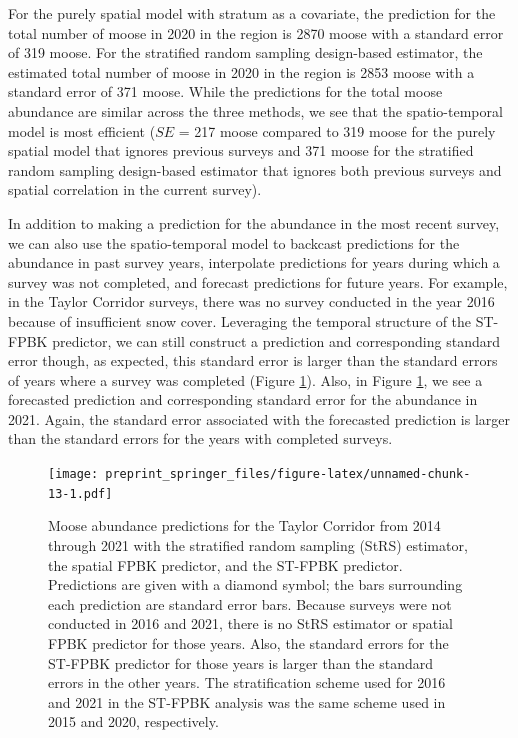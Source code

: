 \documentclass[smallextended]{svjour3}       %
\begin{document}
For the purely spatial model with stratum as a covariate, the prediction
for the total number of moose in 2020 in the region is 2870 moose with a
standard error of 319 moose. For the stratified random sampling
design-based estimator, the estimated total number of moose in 2020 in
the region is 2853 moose with a standard error of 371 moose. While the
predictions for the total moose abundance are similar across the three
methods, we see that the spatio-temporal model is most efficient (\(SE\)
= 217 moose compared to 319 moose for the purely spatial model that
ignores previous surveys and 371 moose for the stratified random
sampling design-based estimator that ignores both previous surveys and
spatial correlation in the current survey).

In addition to making a prediction for the abundance in the most recent
survey, we can also use the spatio-temporal model to backcast
predictions for the abundance in past survey years, interpolate
predictions for years during which a survey was not completed, and
forecast predictions for future years. For example, in the Taylor
Corridor surveys, there was no survey conducted in the year 2016 because
of insufficient snow cover. Leveraging the temporal structure of the
ST-FPBK predictor, we can still construct a prediction and corresponding
standard error though, as expected, this standard error is larger than
the standard errors of years where a survey was completed (Figure
\ref{fig:trend}). Also, in Figure \ref{fig:trend}, we see a forecasted
prediction and corresponding standard error for the abundance in 2021.
Again, the standard error associated with the forecasted prediction is
larger than the standard errors for the years with completed surveys.

\begin{figure}
\centering
\texttt{[image: preprint\_springer\_files/figure-latex/unnamed-chunk-13-1.pdf]}
\caption{\label{fig:trend} Moose abundance predictions for the Taylor
Corridor from 2014 through 2021 with the stratified random sampling
(StRS) estimator, the spatial FPBK predictor, and the ST-FPBK predictor.
Predictions are given with a diamond symbol; the bars surrounding each
prediction are standard error bars. Because surveys were not conducted
in 2016 and 2021, there is no StRS estimator or spatial FPBK predictor
for those years. Also, the standard errors for the ST-FPBK predictor for
those years is larger than the standard errors in the other years. The
stratification scheme used for 2016 and 2021 in the ST-FPBK analysis was
the same scheme used in 2015 and 2020, respectively.}
\end{figure}
\end{document}

